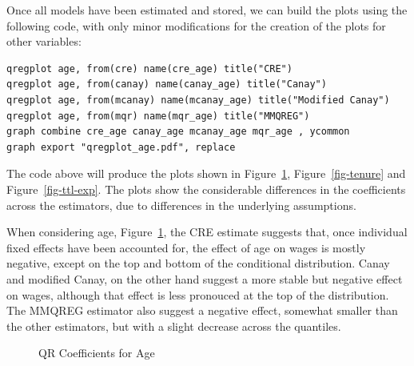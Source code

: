 \documentclass[bib]{statapress}
\begin{document}
Once all models have been estimated and stored, we can build the plots
using the following code, with only minor modifications for the creation
of the plots for other variables:

\begin{verbatim}
qregplot age, from(cre) name(cre_age) title("CRE")
qregplot age, from(canay) name(canay_age) title("Canay")
qregplot age, from(mcanay) name(mcanay_age) title("Modified Canay")
qregplot age, from(mqr) name(mqr_age) title("MMQREG")
graph combine cre_age canay_age mcanay_age mqr_age , ycommon
graph export "qregplot_age.pdf", replace
\end{verbatim}

The code above will produce the plots shown in Figure~\ref{fig-age},
Figure~\ref{fig-tenure} and Figure~\ref{fig-ttl-exp}. The plots show the
considerable differences in the coefficients across the estimators, due
to differences in the underlying assumptions.

When considering age, Figure~\ref{fig-age}, the CRE estimate suggests
that, once individual fixed effects have been accounted for, the effect
of age on wages is mostly negative, except on the top and bottom of the
conditional distribution. Canay and modified Canay, on the other hand
suggest a more stable but negative effect on wages, although that effect
is less pronouced at the top of the distribution. The MMQREG estimator
also suggest a negative effect, somewhat smaller than the other
estimators, but with a slight decrease across the quantiles.

\begin{figure}[H]


\caption{\label{fig-age}QR Coefficients for Age}

\end{figure}%
\end{document}
